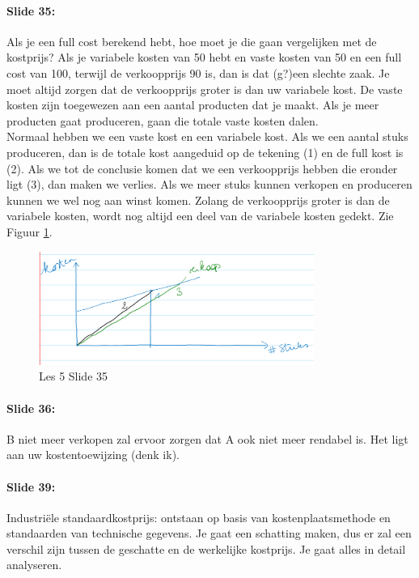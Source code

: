 \documentclass[10pt,a4paper]{report}
\begin{document}
\paragraph{Slide 35:} Als je een full cost berekend hebt, hoe moet je die gaan vergelijken met de kostprijs? Als je variabele kosten van 50 hebt en vaste kosten van 50 en een full cost van 100, terwijl de verkoopprijs 90 is, dan is dat (g?)een slechte zaak. Je moet altijd zorgen dat de verkoopprijs groter is dan uw variabele kost. De vaste kosten zijn toegewezen aan een aantal producten dat je maakt. Als je meer producten gaat produceren, gaan die totale vaste kosten dalen.\\ Normaal hebben we een vaste kost en een variabele kost. Als we een aantal stuks produceren, dan is de totale kost aangeduid op de tekening (1) en de full kost is (2). Als we tot de conclusie komen dat we een verkoopprijs hebben die eronder ligt (3), dan maken we verlies. Als we meer stuks kunnen verkopen en produceren kunnen we wel nog aan winst komen. Zolang de verkoopprijs groter is dan de variabele kosten, wordt nog altijd een deel van de variabele kosten gedekt. Zie Figuur \ref{les05_09}.

\begin{figure}[h!]
\centering
\includegraphics[width=90mm]{Les05_09.png}
\caption{Les 5 Slide 35} 
\label{les05_09}
\end{figure}

\paragraph{Slide 36:} B niet meer verkopen zal ervoor zorgen dat A ook niet meer rendabel is. Het ligt aan uw kostentoewijzing (denk ik).

\paragraph{Slide 39:} Industri\"ele standaardkostprijs: ontstaan op basis van kostenplaatsmethode en standaarden van technische gegevens. Je gaat een schatting maken, dus er zal een verschil zijn tussen de geschatte en de werkelijke kostprijs. Je gaat alles in detail analyseren. 
\end{document}
